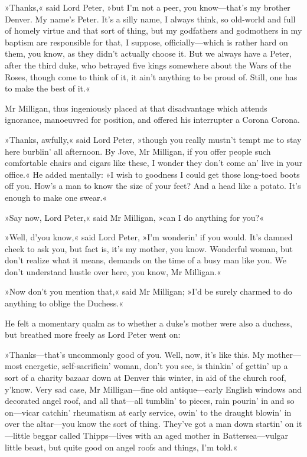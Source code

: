 »Thanks,« said Lord Peter, »but I'm not a peer, you know—that's my brother Denver. My name's Peter. It's a silly name, I always think, so old-world and full of homely virtue and that sort of thing, but my godfathers and godmothers in my baptism are responsible for that, I suppose, officially—which is rather hard on them, you know, as they didn't actually choose it. But we always have a Peter, after the third duke, who betrayed five kings somewhere about the Wars of the Roses, though come to think of it, it ain't anything to be proud of. Still, one has to make the best of it.«

Mr Milligan, thus ingeniously placed at that disadvantage which attends ignorance, manoeuvred for position, and offered his interrupter a Corona Corona.

»Thanks, awfully,« said Lord Peter, »though you really mustn't tempt me to stay here burblin' all afternoon. By Jove, Mr Milligan, if you offer people such comfortable chairs and cigars like these, I wonder they don't come an' live in your office.« He added mentally: »I wish to goodness I could get those long-toed boots off you. How's a man to know the size of your feet? And a head like a potato. It's enough to make one swear.«

»Say now, Lord Peter,« said Mr Milligan, »can I do anything for you?«

»Well, d'you know,« said Lord Peter, »I'm wonderin' if you would. It's damned cheek to ask you, but fact is, it's my mother, you know. Wonderful woman, but don't realize what it means, demands on the time of a busy man like you. We don't understand hustle over here, you know, Mr Milligan.«

»Now don't you mention that,« said Mr Milligan; »I'd be surely charmed to do anything to oblige the Duchess.«

He felt a momentary qualm as to whether a duke's mother were also a duchess, but breathed more freely as Lord Peter went on:

»Thanks—that's uncommonly good of you. Well, now, it's like this. My mother—most energetic, self-sacrificin' woman, don't you see, is thinkin' of gettin' up a sort of a charity bazaar down at Denver this winter, in aid of the church roof, y'know. Very sad case, Mr Milligan—fine old antique—early English windows and decorated angel roof, and all that—all tumblin' to pieces, rain pourin' in and so on—vicar catchin' rheumatism at early service, owin' to the draught blowin' in over the altar—you know the sort of thing. They've got a man down startin' on it—little beggar called Thipps—lives with an aged mother in Battersea—vulgar little beast, but quite good on angel roofs and things, I'm told.«

